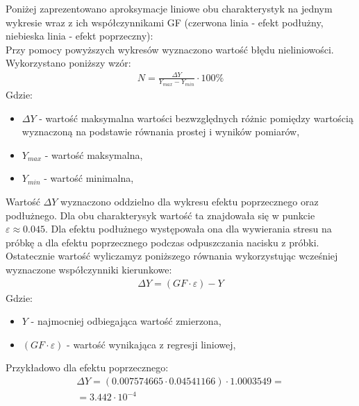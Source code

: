 \documentclass[11pt]{article}
\begin{document}
    \indent Poniżej zaprezentowano aproksymacje liniowe obu charakterystyk
    na jednym wykresie wraz z ich współczynnikami GF (czerwona linia - efekt podłużny, niebieska linia - efekt poprzeczny):\\
    \noindent{}
    \indent Przy pomocy powyższych wykresów wyznaczono wartość błędu nieliniowości. Wykorzystano poniższy wzór:
    \begin{gather*}
        N=\frac{\Delta Y}{Y_{max}-Y_{min}}\cdot 100\%
    \end{gather*}
    \indent Gdzie:
        {\footnotesize
    \begin{itemize}
        \setlength\itemsep{0em}
        \item[] \textbf{$\Delta Y$} - wartość maksymalna wartości bezwzględnych różnic pomiędzy wartością wyznaczoną na podstawie równania prostej i wyników pomiarów,
        \item[] \textbf{$Y_{max}$} - wartość maksymalna,
        \item[] \textbf{$Y_{min}$} - wartość minimalna,
    \end{itemize}}
    \indent Wartość $\Delta Y$ wyznaczono oddzielno dla wykresu efektu poprzecznego oraz podłużnego. Dla obu
    charakterysyk wartość ta znajdowała się w punkcie $\varepsilon \approx 0.045$. Dla efektu podłużnego występowała ona
    dla wywierania stresu na próbkę a dla efektu poprzecznego podczas odpuszczania nacisku z próbki.
    \newpage
    \indent Ostatecznie wartość wyliczamyz poniższego równania wykorzystując wcześniej wyznaczone współczynniki kierunkowe:
    \begin{gather*}
        \Delta Y=(GF\cdot \varepsilon) - Y
    \end{gather*}
    Gdzie:
        {\footnotesize
    \begin{itemize}
        \setlength\itemsep{0em}
        \item[] \textbf{$Y$} - najmocniej odbiegająca wartość zmierzona,
        \item[] \textbf{$(GF\cdot\varepsilon)$} - wartość wynikająca z regresji liniowej,
    \end{itemize}}
    Przykładowo dla efektu poprzecznego:
    \begin{gather*}
        \Delta Y=(0.007574665\cdot 0.04541166)\cdot 1.0003549 = \\
        = 3.442\cdot 10^{-4}
    \end{gather*}
\end{document}
